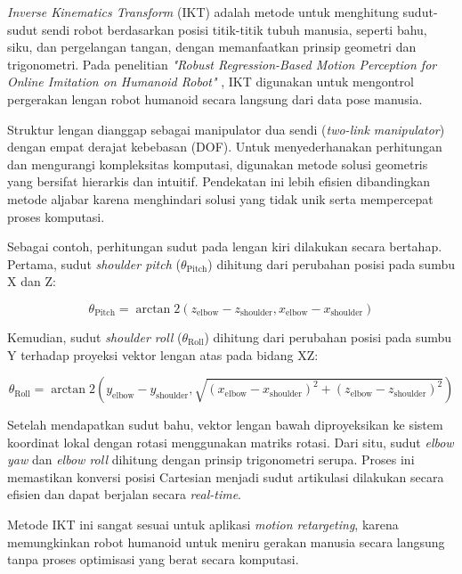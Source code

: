 \textit{Inverse Kinematics Transform} (IKT) adalah metode untuk menghitung sudut-sudut sendi robot berdasarkan posisi titik-titik tubuh manusia, seperti bahu, siku, dan pergelangan tangan, dengan memanfaatkan prinsip geometri dan trigonometri. Pada penelitian \textit{"Robust Regression-Based Motion Perception for Online Imitation on Humanoid Robot"} , IKT digunakan untuk mengontrol pergerakan lengan robot humanoid secara langsung dari data pose manusia.

Struktur lengan dianggap sebagai manipulator dua sendi (\textit{two-link manipulator}) dengan empat derajat kebebasan (DOF). Untuk menyederhanakan perhitungan dan mengurangi kompleksitas komputasi, digunakan metode solusi geometris yang bersifat hierarkis dan intuitif. Pendekatan ini lebih efisien dibandingkan metode aljabar karena menghindari solusi yang tidak unik serta mempercepat proses komputasi.

Sebagai contoh, perhitungan sudut pada lengan kiri dilakukan secara bertahap. Pertama, sudut \textit{shoulder pitch} ($\theta_{\text{Pitch}}$) dihitung dari perubahan posisi pada sumbu X dan Z:

\begin{equation}
\theta_{\text{Pitch}} = \arctan2(z_{\text{elbow}} - z_{\text{shoulder}}, x_{\text{elbow}} - x_{\text{shoulder}})
\end{equation}

Kemudian, sudut \textit{shoulder roll} ($\theta_{\text{Roll}}$) dihitung dari perubahan posisi pada sumbu Y terhadap proyeksi vektor lengan atas pada bidang XZ:

\begin{equation}
\theta_{\text{Roll}} = \arctan2(y_{\text{elbow}} - y_{\text{shoulder}}, \sqrt{(x_{\text{elbow}} - x_{\text{shoulder}})^2 + (z_{\text{elbow}} - z_{\text{shoulder}})^2})
\end{equation}

Setelah mendapatkan sudut bahu, vektor lengan bawah diproyeksikan ke sistem koordinat lokal dengan rotasi menggunakan matriks rotasi. Dari situ, sudut \textit{elbow yaw} dan \textit{elbow roll} dihitung dengan prinsip trigonometri serupa. Proses ini memastikan konversi posisi Cartesian menjadi sudut artikulasi dilakukan secara efisien dan dapat berjalan secara \textit{real-time}.

Metode IKT ini sangat sesuai untuk aplikasi \textit{motion retargeting}, karena memungkinkan robot humanoid untuk meniru gerakan manusia secara langsung tanpa proses optimisasi yang berat secara komputasi.


